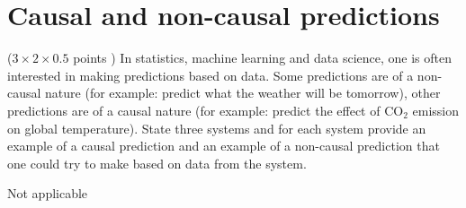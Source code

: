 \section{Causal and non-causal predictions}
($3 \times 2 \times 0.5$ points ) In statistics, machine learning and data science, one is often interested in making predictions based on data.
Some predictions are of a non-causal nature (for example: predict what the weather will be tomorrow),
other predictions are of a causal nature (for example: predict the effect of CO$_2$ emission on global temperature).
State three systems and for each system provide an example of a causal prediction and an example of a non-causal prediction that one could try to make based on data from the system.

\begin{gradedsolution}
Not applicable
\end{gradedsolution}


